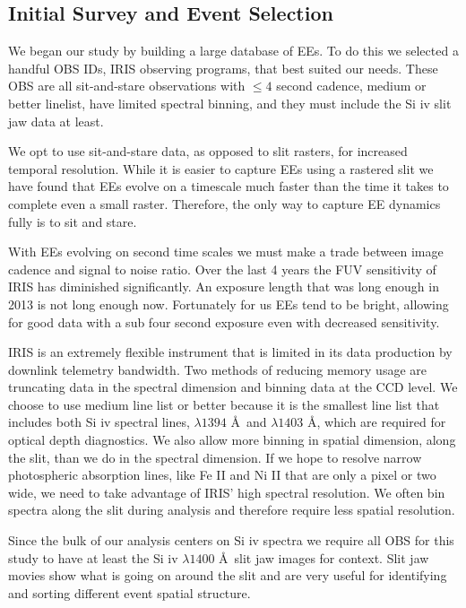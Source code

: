 \documentclass[]{aastex6}
\begin{document}
	\subsection{Initial Survey and Event Selection}
	We began our study by building a large database of EEs.  To do this we selected a handful OBS IDs, IRIS observing programs, that best suited our needs.  These OBS are all sit-and-stare observations with $\leq 4$ second cadence, medium or better linelist, have limited spectral binning, and they must include the Si {\sc iv} slit jaw data at least.   
	
	We opt to use sit-and-stare data, as opposed to slit rasters, for increased temporal resolution.  While it is easier to capture EEs using a rastered slit we have found that EEs evolve on a timescale much faster than the time it takes to complete even a small raster.  Therefore, the only way to capture EE dynamics fully is to sit and stare.  
	
	With EEs evolving on second time scales we must make a trade between image cadence and signal to noise ratio.  Over the last 4 years the FUV sensitivity of IRIS has diminished significantly.  An exposure length that was long enough in 2013 is not long enough now.  Fortunately for us EEs tend to be bright, allowing for good data with a sub four second exposure even with decreased sensitivity.  
	
	IRIS is an extremely flexible instrument that is limited in its data production by downlink telemetry bandwidth.  Two methods of reducing memory usage are truncating data in the spectral dimension and binning data at the CCD level.  We choose to use medium line list or better because it is the smallest line list that includes both Si {\sc iv}  spectral lines, $\lambda 1394$ \AA\  and $\lambda 1403$ \AA, which are required for optical depth diagnostics.  We also allow more binning in spatial dimension, along the slit, than we do in the spectral dimension. If we hope to resolve narrow photospheric absorption lines, like Fe II and Ni II that are only a pixel or two wide, we need to take advantage of IRIS' high spectral resolution.  We often bin spectra along the slit during analysis and therefore require less spatial resolution.
	
	Since the bulk of our analysis centers on Si {\sc iv} spectra we require all OBS for this study to have at least the Si {\sc iv} $\lambda1400$ \AA \ slit jaw images for context.  Slit jaw movies show what is going on around the slit and are very useful for identifying and sorting different event spatial structure.
	
\end{document}
